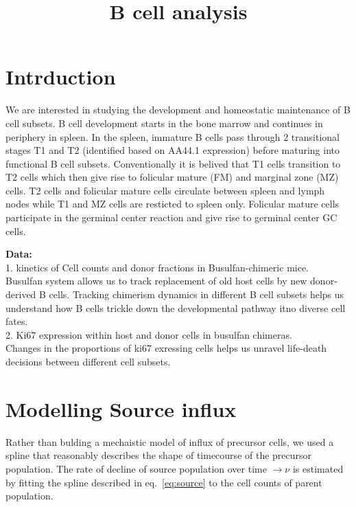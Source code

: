 \documentclass[11pt]{article}
\title{B cell analysis}
\author{}
\date{}
\newcommand{\blue}[1]{{\color{blue}{#1}}}
\begin{document}
 
\maketitle

\section*{Intrduction}
We are interested in studying the development and homeostatic maintenance of B cell subsets.
B cell development starts in the bone marrow and continues in periphery in spleen. In the spleen, immature B cells pass through 2 transitional stages T1 and T2 (identified based on AA44.1 expression) before maturing into functional B cell subsets.
Conventionally it is belived that T1 cells transition to T2 cells which then give rise to folicular mature (FM) and marginal zone (MZ) cells.
T2 cells and folicular mature cells circulate between spleen and lymph nodes while T1 and MZ cells are resticted to spleen only. Folicular mature cells participate in the germinal center reaction and give rise to germinal center GC cells.

\blue{Development and dynamics of GC B cells may be influenced by GC T cells and the kinetics of antigen decay. GC rection on an average lasts for $\sim$ 3 weeks.}


\textbf{Data:} \\
1. kinetics of Cell counts and donor fractions in Busulfan-chimeric mice. \\
Busulfan system allows us to track replacement of old host cells by new donor-derived B cells. Tracking chimerism dynamics in different B cell subsets helps us understand how B cells trickle down the developmental pathway itno diverse cell fates.\\

2. Ki67 expression within host and donor cells in busulfan chimeras.\\
Changes in the proportions of ki67 exressing cells helps us unravel life-death decisions between different cell subsets. 


\section*{Modelling Source influx} 
Rather than bulding a mechaistic model of influx of precursor cells, we used a spline that reasonably describes the shape of timecourse of the precursor population.
The rate of decline of source population over time $\rightarrow \nu$  is estimated by fitting the spline described in eq.~\ref{eq:source} to the cell counts of parent population.
\end{document}
